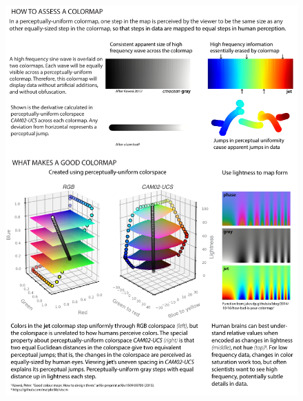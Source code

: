 \documentclass[10pt,journal,compsoc]{IEEEtran}
\begin{document}
\begin{figure}
	\includegraphics[width=\textwidth]{figures/evaluation.pdf}
	\caption{}
	\label{fig:evaluation}
\end{figure}
\nocite{kovesi2015good}
\nocite{viscm}
\end{document}
